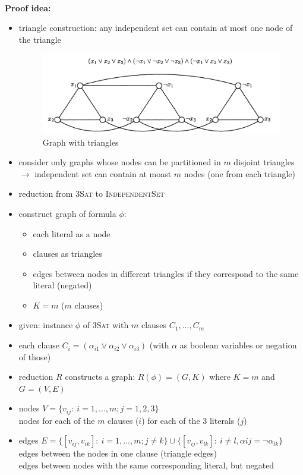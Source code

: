 \documentclass[a4]{scrartcl}
\begin{document}
\ \\
\textbf{Proof idea:}
\begin{itemize}
\item triangle construction: any independent set can contain at most one node of the triangle
\begin{figure}[H]
\begin{center}
\includegraphics[scale=0.5]{triangle.jpg}
\end{center}
\caption{Graph with triangles \cite{book}}
\end{figure}
\item consider only graphs whose nodes can be partitioned in $m$ disjoint triangles \\
$\rightarrow$ independent set can contain at moast $m$ nodes (one from each triangle)
\item reduction from \textsc{3Sat} to \textsc{IndependentSet}
\item construct graph of formula $\phi$:
\begin{itemize}
\item each literal as a node
\item clauses as triangles
\item edges between nodes in different triangles if they correspond to the same literal (negated)
\item $K = m$ ($m$ clauses) 
\end{itemize}

\item given: instance $\phi$ of \textsc{3Sat} with $m$ clauses $C_1,...,C_m$
\item each clause $C_i=(\alpha_{i1} \lor \alpha_{i2} \lor \alpha_{i3})$ (with $\alpha$ as boolean variables or negation of those)
\item reduction $R$ constructs a graph: $R(\phi) = (G, K)$ where $K=m$ and $G=(V,E)$
\item nodes $V = \{ v_{ij}: \ i = 1, ..., m; j = 1, 2, 3 \}$ \\
nodes for each of the $m$ clauses ($i$) for each of the 3 literals ($j$)
\item edges $E = \{ [ v_{ij}, v_{ik}  ] : \ i = 1, ..., m; j \neq k \} \cup \{ [ v_{ij}, v_{lk}  ] : \ i  \neq l, \alpha{ij} = \neg \alpha_{lk} \}$ \\
edges between the nodes in one clause (triangle edges) \\
edges between nodes with the same corresponding literal, but negated\\


\end{itemize}
\end{document}
